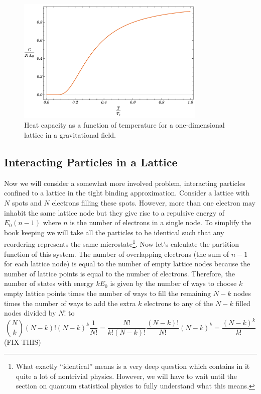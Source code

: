 \documentclass[11pt,a4paper]{article}
\theoremstyle{theorem}
\theoremstyle{definition}
\theoremstyle{definition}
\theoremstyle{remark}
\theoremstyle{definition}
\theoremstyle{remark}
\begin{document}
\begin{figure}
\begin{center}
\includegraphics[width = 9cm, height = 6cm]{GravLatticeCapacity}
\caption{Heat capacity as a function of temperature for a one-dimensional lattice in a gravitational field.}
\label{capacitygravlattice}
\end{center}
\end{figure}

\subsection{Interacting Particles in a Lattice}

Now we will consider a somewhat more involved problem, interacting particles confined to a lattice in the tight binding approximation. Consider a lattice with $N$ spots and $N$ electrons filling these spots. However, more than one electron may inhabit the same lattice node but they give rise to a repulsive energy of $E_0(n - 1)$ where $n$ is the number of electrons in a single node. To simplify the book keeping we will take all the particles to be identical such that any reordering represents the same microstate\footnote{What exactly ``identical'' means is a very deep question which contains in it quite a lot of nontrivial physics. However, we will have to wait until the section on quantum statistical physics to fully understand what this means.}. Now let's calculate the partition function of this system. The number of overlapping electrons (the sum of $n - 1$ for each lattice node) is equal to the number of empty lattice nodes because the number of lattice points is equal to the number of electrons. Therefore, the number of states with energy $k E_0$ is given by the number of ways to choose $k$ empty lattice points times the number of ways to fill the remaining $N - k$ nodes times the number of ways to add the extra $k$ electrons to any of the $N - k$ filled nodes divided by $N!$ to 
\[ {N \choose k} (N - k)! (N - k)^k \frac{1}{N!} = \frac{N!}{k! (N - k)!} \frac{(N - k)!}{N!} (N - k)^k = \frac{(N - k)^k}{k!} \] 
(FIX THIS)
\end{document}
